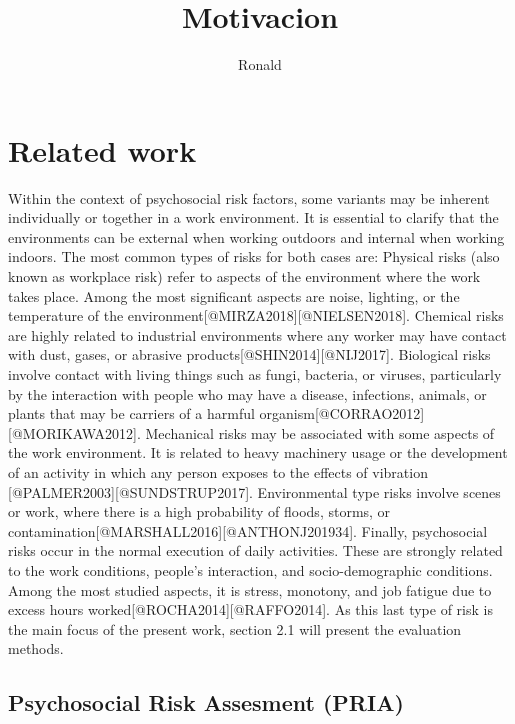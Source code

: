 \documentclass[]{article}
\title{Motivacion}
\author{Ronald}
\date{}
\begin{document}
\maketitle

\hypertarget{related-work}{%
\section{Related work}\label{related-work}}

Within the context of psychosocial risk factors, some variants may be
inherent individually or together in a work environment. It is essential
to clarify that the environments can be external when working outdoors
and internal when working indoors. The most common types of risks for
both cases are: Physical risks (also known as workplace risk) refer to
aspects of the environment where the work takes place. Among the most
significant aspects are noise, lighting, or the temperature of the
environment{[}@MIRZA2018{]}{[}@NIELSEN2018{]}. Chemical risks are highly
related to industrial environments where any worker may have contact
with dust, gases, or abrasive products{[}@SHIN2014{]}{[}@NIJ2017{]}.
Biological risks involve contact with living things such as fungi,
bacteria, or viruses, particularly by the interaction with people who
may have a disease, infections, animals, or plants that may be carriers
of a harmful organism{[}@CORRAO2012{]}{[}@MORIKAWA2012{]}. Mechanical
risks may be associated with some aspects of the work environment. It is
related to heavy machinery usage or the development of an activity in
which any person exposes to the effects of vibration
{[}@PALMER2003{]}{[}@SUNDSTRUP2017{]}. Environmental type risks involve
scenes or work, where there is a high probability of floods, storms, or
contamination{[}@MARSHALL2016{]}{[}@ANTHONJ201934{]}. Finally,
psychosocial risks occur in the normal execution of daily activities.
These are strongly related to the work conditions, people's interaction,
and socio-demographic conditions. Among the most studied aspects, it is
stress, monotony, and job fatigue due to excess hours
worked{[}@ROCHA2014{]}{[}@RAFFO2014{]}. As this last type of risk is the
main focus of the present work, section 2.1 will present the evaluation
methods.

\hypertarget{psychosocial-risk-assesment-pria}{%
\subsection{Psychosocial Risk Assesment
(PRIA)}\label{psychosocial-risk-assesment-pria}}
\end{document}
